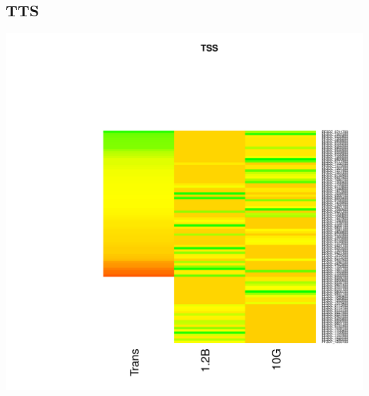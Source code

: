 \documentclass{article}\usepackage[]{graphicx}\usepackage[]{color}
\newenvironment{knitrout}{}{} %
\begin{document}
\subsection{TTS}
\begin{knitrout}
\color{fgcolor}

{\centering \includegraphics[width=.9\linewidth]{figure/minimal-heatmap_tts-1} 

}



\end{knitrout}
\clearpage
\end{document}

